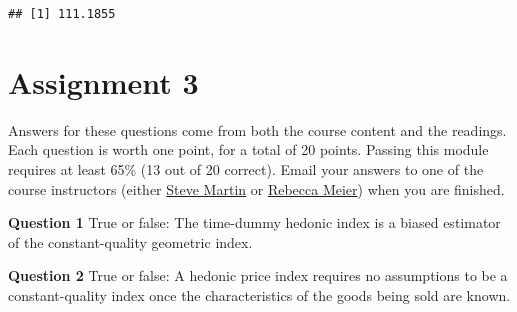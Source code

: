 \documentclass[]{article}
\newenvironment{Shaded}{\begin{snugshade}}{\end{snugshade}}
\newcommand{\CommentTok}[1]{\textcolor[rgb]{0.56,0.35,0.01}{\textit{#1}}}
\newcommand{\DataTypeTok}[1]{\textcolor[rgb]{0.13,0.29,0.53}{#1}}
\newcommand{\DecValTok}[1]{\textcolor[rgb]{0.00,0.00,0.81}{#1}}
\newcommand{\KeywordTok}[1]{\textcolor[rgb]{0.13,0.29,0.53}{\textbf{#1}}}
\newcommand{\NormalTok}[1]{#1}
\newcommand{\OperatorTok}[1]{\textcolor[rgb]{0.81,0.36,0.00}{\textbf{#1}}}
\newcommand{\StringTok}[1]{\textcolor[rgb]{0.31,0.60,0.02}{#1}}
\begin{document}
\begin{Shaded}
\end{Shaded}

\begin{verbatim}
## [1] 111.1855
\end{verbatim}

\hypertarget{assignment-3}{%
\section{Assignment 3}\label{assignment-3}}

Answers for these questions come from both the course content and the readings. Each question is worth one point, for a total of 20 points. Passing this module requires at least 65\% (13 out of 20 correct). Email your answers to one of the course instructors (either \href{mailto:steve.martin5@canada.ca}{Steve Martin} or \href{mailto:rebecca.meier@canada.ca}{Rebecca Meier}) when you are finished.

\textbf{Question 1} True or false: The time-dummy hedonic index is a biased estimator of the constant-quality geometric index.

\textbf{Question 2} True or false: A hedonic price index requires no assumptions to be a constant-quality index once the characteristics of the goods being sold are known.
\end{document}

